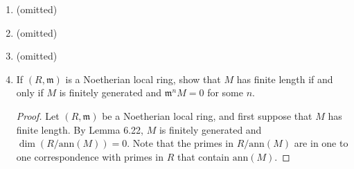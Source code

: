 \documentclass[11pt,oneside,english]{amsart}
\theoremstyle{definition}
\begin{document}
\begin{enumerate}[leftmargin=*]
\begin{enumerate}
\begin{proof}
\begin{align*}
(I\cap J:x^\infty)&=\bigcup_{n=1}^\infty (I\cap J:x^n)\\[2mm]
&=\bigcup_{n=1}^\infty \{r\in R\mid rx^n\in I\cap J\}\\[2mm]
&=\bigcup_{n=1}^\infty \{r\in R\mid rx^n\in I\}\cap \{r\in R\mid rx^n\in J\}\\[2mm]
&=\bigcup_{n=1}^\infty \{r\in R\mid rx^n\in I\}\cap \bigcup_{n=1}^\infty \{r\in R\mid rx^n\in J\}\\[2mm]
&=(I:x^\infty)\cap (J:x^\infty).\qedhere
\end{align*}
\end{proof}

\item Let $I = Q_1 \cap \cdots \cap Q_k$ be a primary decomposition, and $x \in R$. Show that
\[
(I : x^\infty) = \bigcap_{x \notin \sqrt{Q_i}} Q_i.
\]
\begin{proof}
First note that by part (c) above, 
\begin{align*}
(I : x^\infty) &= ((Q_1\cap Q_2\cap \cdots \cap Q_k:x^\infty)\\[2mm]
&=(Q_1:x^\infty) \cap (Q_2: x^\infty) \cap \cdots \cap (Q_k:x^\infty).
\end{align*}
Also, each $Q_i$ is $\sqrt{Q_i}$ -primary, so by part (a) above, $(Q_i:x^\infty)=Q_i$ if $x\notin \sqrt{Q_i}$. Hence,
\[
(I : x^\infty)=(Q_1:x^\infty) \cap (Q_2: x^\infty) \cap \cdots \cap (Q_k:x^\infty)=\bigcap_{x \notin \sqrt{Q_i}} Q_i.\qedhere
\]
\end{proof}

\end{enumerate}

\item (omitted)

\item (omitted)

\item (omitted)

\pagebreak

\item If $(R, \mathfrak{m})$ is a Noetherian local ring, show that $M$ has finite length if and only if $M$ is finitely generated and $\mathfrak{m}^n M = 0$ for some $n$.

\begin{proof}
Let $(R, \mathfrak{m})$ be a Noetherian local ring, and first suppose that $M$ has finite length. By Lemma 6.22, $M$ is finitely generated and $\dim (R/\text{ann}(M))=0$. Note that the primes in $R/\text{ann}(M)$ are in one to one correspondence with primes in $R$ that contain $\text{ann}(M)$.


\end{proof}
\end{enumerate}
\end{document}
